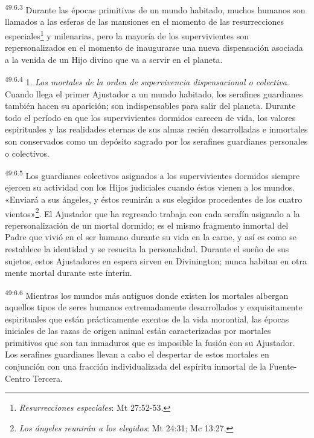 \par
\textsuperscript{49:6.3} Durante las épocas primitivas de un mundo habitado, muchos humanos son llamados a las esferas de las mansiones en el momento de las resurrecciones especiales\footnote{\textit{Resurrecciones especiales}: Mt 27:52-53.} y milenarias, pero la mayoría de los supervivientes son repersonalizados en el momento de inaugurarse una nueva dispensación asociada a la venida de un Hijo divino que va a servir en el planeta.

\par
\textsuperscript{49:6.4} 1. \textit{Los mortales de la orden de supervivencia dispensacional o colectiva}. Cuando llega el primer Ajustador a un mundo habitado, los serafines guardianes también hacen su aparición; son indispensables para salir del planeta. Durante todo el período en que los supervivientes dormidos carecen de vida, los valores espirituales y las realidades eternas de sus almas recién desarrolladas e inmortales son conservados como un depósito sagrado por los serafines guardianes personales o colectivos.

\par
\textsuperscript{49:6.5} Los guardianes colectivos asignados a los supervivientes dormidos siempre ejercen su actividad con los Hijos judiciales cuando éstos vienen a los mundos. «Enviará a sus ángeles, y éstos reunirán a sus elegidos procedentes de los cuatro vientos»\footnote{\textit{Los ángeles reunirán a los elegidos}: Mt 24:31; Mc 13:27.}. El Ajustador que ha regresado trabaja con cada serafín asignado a la repersonalización de un mortal dormido; es el mismo fragmento inmortal del Padre que vivió en el ser humano durante su vida en la carne, y así es como se restablece la identidad y se resucita la personalidad. Durante el sueño de sus sujetos, estos Ajustadores en espera sirven en Divinington; nunca habitan en otra mente mortal durante este ínterin.

\par
\textsuperscript{49:6.6} Mientras los mundos más antiguos donde existen los mortales albergan aquellos tipos de seres humanos extremadamente desarrollados y exquisitamente espirituales que están prácticamente exentos de la vida morontial, las épocas iniciales de las razas de origen animal están caracterizadas por mortales primitivos que son tan inmaduros que es imposible la fusión con su Ajustador. Los serafines guardianes llevan a cabo el despertar de estos mortales en conjunción con una fracción individualizada del espíritu inmortal de la Fuente-Centro Tercera.

